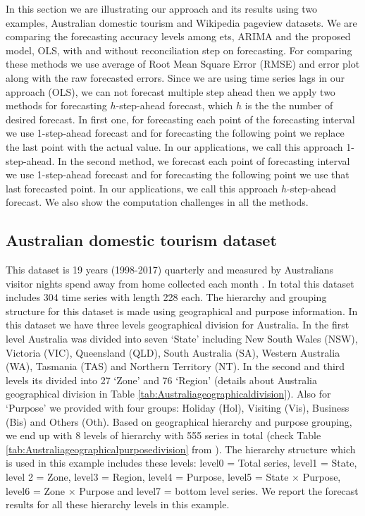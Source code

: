 \documentclass[11pt,a4paper,]{article}
\begin{document}
In this section we are illustrating our approach and its results using
two examples, Australian domestic tourism and Wikipedia pageview
datasets. We are comparing the forecasting accuracy levels among ets,
ARIMA and the proposed model, OLS, with and without reconciliation step
on forecasting. For comparing these methods we use average of Root Mean
Square Error (RMSE) and error plot along with the raw forecasted errors.
Since we are using time series lags in our approach (OLS), we can not
forecast multiple step ahead then we apply two methods for forecasting
\(h\)-step-ahead forecast, which \(h\) is the the number of desired
forecast. In first one, for forecasting each point of the forecasting
interval we use 1-step-ahead forecast and for forecasting the following
point we replace the last point with the actual value. In our
applications, we call this approach 1-step-ahead. In the second method,
we forecast each point of forecasting interval we use 1-step-ahead
forecast and for forecasting the following point we use that last
forecasted point. In our applications, we call this approach
\(h\)-step-ahead forecast. We also show the computation challenges in
all the methods.

\subsection{Australian domestic tourism
dataset}\label{australian-domestic-tourism-dataset}

This dataset is 19 years (1998-2017) quarterly and measured by
Australians visitor nights spend away from home collected each month
\autocite{wickramasuriya2018optimal}. In total this dataset includes 304
time series with length 228 each. The hierarchy and grouping structure
for this dataset is made using geographical and purpose information. In
this dataset we have three levels geographical division for Australia.
In the first level Australia was divided into seven `State' including
New South Wales (NSW), Victoria (VIC), Queensland (QLD), South Australia
(SA), Western Australia (WA), Tasmania (TAS) and Northern Territory
(NT). In the second and third levels its divided into 27 `Zone' and 76
`Region' (details about Australia geographical division in Table
\ref{tab:Australiageographicaldivision}). Also for `Purpose' we provided
with four groups: Holiday (Hol), Visiting (Vis), Business (Bis) and
Others (Oth). Based on geographical hierarchy and purpose grouping, we
end up with 8 levels of hierarchy with 555 series in total (check Table
\ref{tab:Australiageographicalpurposedivision} from
\autocite{wickramasuriya2018optimal}). The hierarchy structure which is
used in this example includes these levels: level0 = Total series,
level1 = State, level 2 = Zone, level3 = Region, level4 = Purpose,
level5 = State \(\times\) Purpose, level6 = Zone \(\times\) Purpose and
level7 = bottom level series. We report the forecast results for all
these hierarchy levels in this example.
\end{document}
